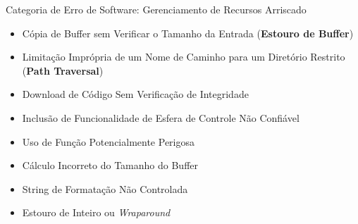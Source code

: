 \begin{frame}{Categoria de Erro de Software: Gerenciamento de Recursos Arriscado}
    \begin{itemize}
        \item Cópia de Buffer sem Verificar o Tamanho da Entrada (\textbf{Estouro de Buffer})
        \item Limitação Imprópria de um Nome de Caminho para um Diretório Restrito (\textbf{Path Traversal})
        \item Download de Código Sem Verificação de Integridade
        \item Inclusão de Funcionalidade de Esfera de Controle Não Confiável
        \item Uso de Função Potencialmente Perigosa
        \item Cálculo Incorreto do Tamanho do Buffer
        \item String de Formatação Não Controlada
        \item Estouro de Inteiro ou \textit{Wraparound}
    \end{itemize}
\end{frame}

